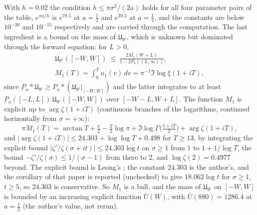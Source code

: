 With $h=0.02$ the condition $h\le\pi\sigma^2/(2a)$ holds for all four parameter pairs of the table, $e^{\pi a/h}$ is $e^{78.5}$ at $a=\tfrac12$ and $e^{39.3}$ at $a=\tfrac14$, and the constants are below $10^{-30}$ and $10^{-15}$ respectively and are carried through the computation. The last ingredient is a bound on the mass of $\mathfrak U_{\theta'}$, which is unknown but dominated through the forward equation: for $L>0$,
\[
\begin{gathered}\mathfrak U_{\theta'}([-W,W])\ \le\ \frac{2M_1(W+L)}{1-2P_a((L,\infty))},\\ M_1(T)=\int_0^Tu_1(v)\,dv=\pi^{-1}\Im\log\xi(1+iT),\end{gathered}
\]
since $P_a*\mathfrak U_{\theta'}\ge P_a*(\mathfrak U_{\theta'}|_{[-W,W]})$ and the latter integrates to at least $P_a([-L,L])\,\mathfrak U_{\theta'}([-W,W])$ over $[-W-L,W+L]$. The function $M_1$ is explicit up to $\arg\zeta(1+iT)$ (continuous branches of the logarithms, continued horizontally from $\sigma=+\infty$):
\[
\pi M_1(T)=\arctan T+\tfrac\pi2-\tfrac T2\log\pi+\Im\log\Gamma\bigl(\tfrac{1+iT}2\bigr)+\arg\zeta(1+iT),
\]
and $|\arg\zeta(1+iT)|\le24.303+\log\log T+0.498$ for $T\ge13$, by integrating the explicit bound $|\zeta'/\zeta(\sigma+it)|\le24.303\log t$ on $\sigma\ge1$ from $1$ to $1+1/\log T$, the bound $-\zeta'/\zeta(\sigma)\le1/(\sigma-1)$ from there to $2$, and $\log\zeta(2)=0.4977$ beyond. The explicit bound is Leong's \cite{Leong24}; the constant $24.303$ is the author's, and the corollary of that paper is reported (unchecked) to give $18.062\log t$ for $\sigma\ge1$, $t\ge5$, so $24.303$ is conservative. So $M_1$ is a ball, and the mass of $\mathfrak U_{\theta'}$ on $[-W,W]$ is bounded by an increasing explicit function $\overline U(W)$, with $\overline U(880)=1286.4$ at $a=\tfrac12$ (the author's value, not rerun).

